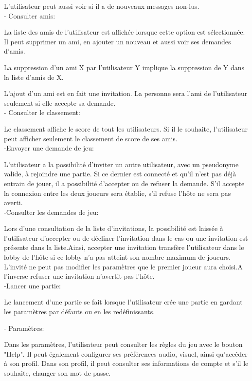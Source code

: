 \documentclass[a4paper,12pt]{article}
\begin{document}
L'utilisateur peut aussi voir si il a de nouveaux messages non-lus.\\

- Consulter amis:

La liste des amis de l'utilisateur est affichée lorsque cette option est sélectionnée. Il peut supprimer un ami, en ajouter un nouveau et aussi voir ses demandes d'amis. 

La suppression d'un ami X par l'utilisateur Y implique la suppression de Y dans la liste d'amis de X. 

L'ajout d'un ami est en fait une invitation. La personne sera l'ami de l'utilisateur seulement si elle accepte sa demande. \\

- Consulter le classement:

Le classement affiche le score de tout les utilisateurs. Si il le souhaite, l'utilisateur peut afficher seulement le classement de score de ses amis. \\

-Envoyer une demande de jeu:

L’utilisateur a la possibilité d’inviter un autre utilisateur, avec un pseudonyme valide, à rejoindre une partie. Si ce dernier est connecté et qu’il n’est pas déjà entrain de jouer, il a possibilité d’accepter ou de refuser la demande. S’il accepte la connexion entre les deux joueurs sera établie, s’il refuse l’hôte ne sera pas averti. \\

-Consulter les demandes de jeu:

Lors d’une consultation de la liste d’invitations, la possibilité est laissée à l’utilisateur d’accepter ou de décliner l’invitation dans le cas ou une invitation est présente dans la liste.Ainsi, accepter une invitation transfère l’utilisateur dans le lobby de l’hôte si ce lobby n’a pas atteint son nombre maximum de joueurs. L’invité ne peut pas modifier les paramètres que le premier joueur aura choisi.A l’inverse refuser une invitation n’avertit pas l’hôte. \\

-Lancer une partie:

Le lancement d’une partie se fait lorsque l’utilisateur crée une partie en gardant les paramètres par défauts ou en les redéfinissants.

- Paramètres:

Dans les paramètres, l'utilisateur peut consulter les règles du jeu avec le bouton "Help". Il peut également configurer ses préférences audio, visuel, ainsi qu'accéder à son profil. Dans son profil, il peut consulter ses informations de compte et s'il le souhaite, changer son mot de passe.
\end{document}

